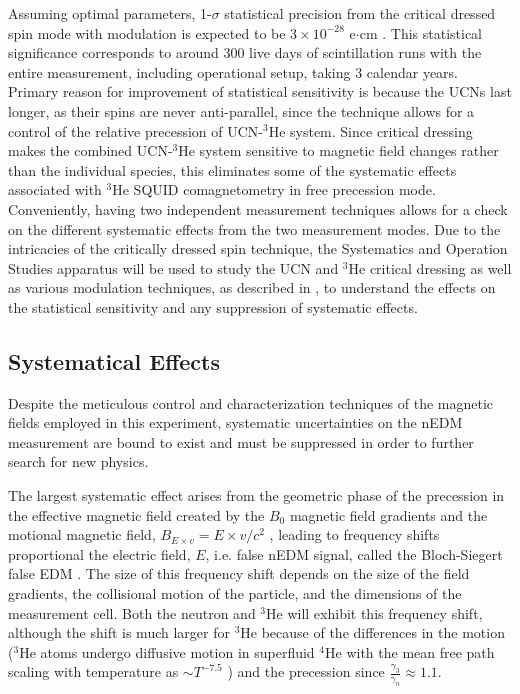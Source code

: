 Assuming optimal parameters, 1-$\sigma$ statistical precision from the critical dressed spin mode with modulation is expected to be $3 \times 10^{-28}$ e$\cdot$cm \cite{Ahmed2019}. This statistical significance corresponds to around 300 live days of scintillation runs with the entire measurement, including operational setup, taking 3 calendar years. Primary reason for improvement of statistical sensitivity is because the UCNs last longer, as their spins are never anti-parallel, since the technique allows for a control of the relative precession of UCN-$^3$He system. Since critical dressing makes the combined UCN-$^3$He system sensitive to magnetic field changes rather than the individual species, this eliminates some of the systematic effects associated with $^3$He SQUID comagnetometry in free precession mode. Conveniently, having two independent measurement techniques allows for a check on the different systematic effects from the two measurement modes. Due to the intricacies of the critically dressed spin technique, the Systematics and Operation Studies apparatus \cite{Ahmed2019} will be used to study the UCN and $^3$He critical dressing as well as various modulation techniques, as described in \cite{Swank2018, Ahmed2019, Tat2022}, to understand the effects on the statistical sensitivity and any suppression of systematic effects.

\subsection{Systematical Effects}

Despite the meticulous control and characterization techniques of the magnetic fields employed in this experiment, systematic uncertainties on the nEDM measurement are bound to exist and must be suppressed in order to further search for new physics.

The largest systematic effect arises from the geometric phase of the precession in the effective magnetic field created by the $B_0$ magnetic field gradients and the motional magnetic field, $B_{E \times v} = E \times v/c^2$ , leading to frequency shifts proportional the electric field, $E$, i.e. false nEDM signal, called the Bloch-Siegert false EDM \cite{Bloch1940, Pendlebury2004}. The size of this frequency shift depends on the size of the field gradients, the collisional motion of the particle, and the dimensions of the measurement cell. Both the neutron and $^3$He will exhibit this frequency shift, although the shift is much larger for $^3$He because of the differences in the motion ($^3$He atoms undergo diffusive motion in superfluid $^4$He with the mean free path scaling with temperature as $ \sim T^{-7.5}$ \cite{Baym2013}) and the precession since $ \frac{\gamma_3}{\gamma_n} \approx 1.1$.


